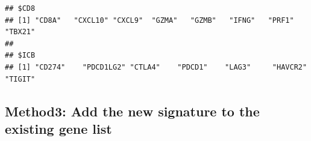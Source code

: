 \documentclass[
  12pt,
]{book}
\newenvironment{Shaded}{\begin{snugshade}}{\end{snugshade}}
\newcommand{\FunctionTok}[1]{\textcolor[rgb]{0.13,0.29,0.53}{\textbf{#1}}}
\newcommand{\NormalTok}[1]{#1}
\newcommand{\OtherTok}[1]{\textcolor[rgb]{0.56,0.35,0.01}{#1}}
\newcommand{\SpecialCharTok}[1]{\textcolor[rgb]{0.81,0.36,0.00}{\textbf{#1}}}
\newcommand{\StringTok}[1]{\textcolor[rgb]{0.31,0.60,0.02}{#1}}
\begin{document}
\begin{verbatim}
## $CD8
## [1] "CD8A"   "CXCL10" "CXCL9"  "GZMA"   "GZMB"   "IFNG"   "PRF1"   "TBX21" 
## 
## $ICB
## [1] "CD274"    "PDCD1LG2" "CTLA4"    "PDCD1"    "LAG3"     "HAVCR2"   "TIGIT"
\end{verbatim}

\hypertarget{method3-add-the-new-signature-to-the-existing-gene-list}{%
\subsection{Method3: Add the new signature to the existing gene list}\label{method3-add-the-new-signature-to-the-existing-gene-list}}

\begin{Shaded}
\end{Shaded}
\end{document}
